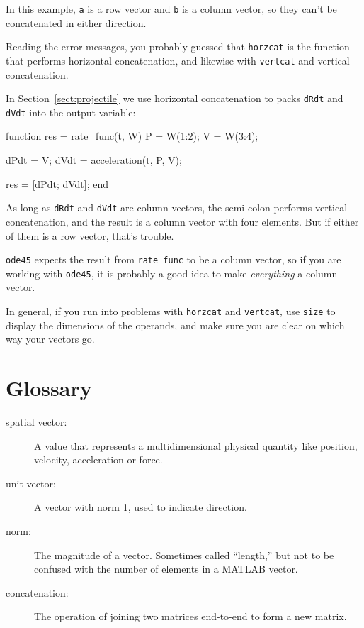 \documentclass[
]{book}
\numberwithin{Answer}{chapter}
\numberwithin{Exercise}{chapter}
\begin{document}
In this example, {\tt a} is a row vector and {\tt b} is a column
vector, so they can't be concatenated in either direction.

Reading the error messages, you probably guessed that {\tt horzcat}
is the function that performs horizontal concatenation, and likewise
with {\tt vertcat} and vertical concatenation.

In Section~\ref{sect:projectile} we use horizontal concatenation to packs {\tt dRdt} and {\tt dVdt} into the output variable:

\begin{code}
function res = rate_func(t, W)
    P = W(1:2);
    V = W(3:4);

    dPdt = V;
    dVdt = acceleration(t, P, V);

    res = [dPdt; dVdt];
end
\end{code}

As long as {\tt dRdt} and {\tt dVdt} are column vectors,
the semi-colon performs vertical concatenation, and the result is
a column vector with four elements.  But if either of them is a
row vector, that's trouble.

{\tt ode45} expects the result from \verb"rate_func" to be a
column vector, so if you are working with {\tt ode45}, it is
probably a good idea to make {\em everything} a column vector.

In general, if you run into problems with {\tt horzcat} and
{\tt vertcat}, use {\tt size} to display the dimensions of the operands,
and make sure you are clear on which way your vectors go.


\section{Glossary}

\begin{description}

\item[spatial vector:] A value that represents a
multidimensional physical quantity like position, velocity,
acceleration or force.

\item[unit vector:] A vector with norm 1, used to indicate
direction.

\item[norm:] The magnitude of a vector.  Sometimes called ``length,''
but not to be confused with the number of elements in a MATLAB
vector.

\item[concatenation:] The operation of joining two matrices end-to-end to
form a new matrix.

\end{description}
\end{document}
